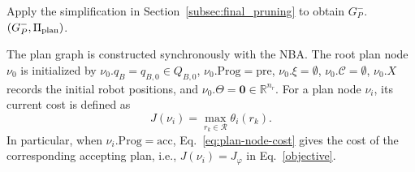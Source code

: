 \documentclass[lettersize,journal]{IEEEtran}
\theoremstyle{italiclemma}
\theoremstyle{italiclemma}
\theoremstyle{definition}
\begin{document}
\begin{algorithm}[t]
\begin{algorithmic}[1]
\ENDWHILE
\STATE Apply the simplification in Section~\ref{subsec:final_pruning} to obtain $G_P^{-}$.
\RETURN $(G_P^{-},\Pi_{\rm plan})$.
\end{algorithmic}
\end{algorithm}
The plan graph is constructed synchronously with the NBA. 
The root plan node $\nu_0$ is initialized by
$\nu_0.q_B=q_{B,0}\in Q_{B,0}$,
$\nu_0.\mathrm{Prog}=\mathrm{pre}$,
$\nu_0.\xi=\emptyset$,
$\nu_0.\mathcal C=\emptyset$,
$\nu_0.X$ records the initial robot positions, and
$\nu_0.\Theta=\mathbf{0}\in\mathbb{R}^{n_r}$.
For a plan node $\nu_i$, its current cost is defined as
\begin{equation}
J(\nu_i)=\max_{r_k\in\mathcal R}\theta_i(r_k).
\label{eq:plan-node-cost}
\end{equation}
In particular, when $\nu_i.\mathrm{Prog}=\mathrm{acc}$,
Eq.~\eqref{eq:plan-node-cost} gives the cost of the corresponding accepting plan, i.e., $J(\nu_i)=J_\varphi$ in
Eq.~\eqref{objective}.
\end{document}
